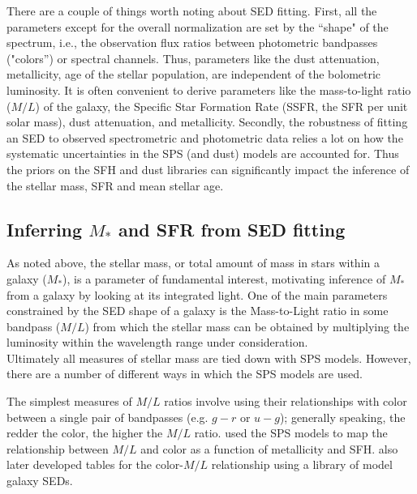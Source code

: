 There are a couple of things worth noting about SED fitting.  First,
all the parameters except for the overall normalization are set by the
``shape" of the spectrum, i.e., the observation flux ratios between
photometric bandpasses ("colors'') or spectral channels.  Thus,
parameters like the dust attenuation, metallicity, age of the stellar
population, are independent of the bolometric luminosity. It is often
convenient to derive parameters like the mass-to-light ratio ($M/L$)
of the galaxy, the Specific Star Formation Rate (SSFR, the SFR per
unit solar mass), dust attenuation, and metallicity.  Secondly, the
robustness of fitting an SED to observed spectrometric and photometric
data relies a lot on how the systematic uncertainties in the SPS (and
dust) models are accounted for. Thus the priors on the SFH and dust
libraries can significantly impact the inference of the stellar mass,
SFR and mean stellar age.\\


\subsection{Inferring $M_{*}$ and SFR from SED fitting}
\label{masses}

As noted above, the stellar mass, or total amount of mass in stars
within a galaxy ($M_\ast$), is a parameter of fundamental interest,
motivating inference of $M_{*}$ from a galaxy by looking at its
integrated light. One of the main parameters constrained by the SED
shape of a galaxy is the Mass-to-Light ratio in some bandpass ($M/L$)
from which the stellar mass can be obtained by multiplying the
luminosity within the wavelength range under consideration.\\
Ultimately all measures of stellar mass are tied down with SPS
models. However, there are a number of different ways in which the SPS
models are used.

The simplest measures of $M/L$ ratios involve using their
relationships with color between a single pair of bandpasses
(e.g. $g-r$ or $u-g$); generally speaking, the redder the color, the
higher the $M/L$ ratio. \citet{2001ApJ...550..212B} used the
\citet{bruzual_stellar_2003} SPS models to map the relationship
between $M/L$ and color as a function of metallicity and
SFH. \citep{2009MNRAS.400.1181Z} also later developed tables for the
color-$M/L$ relationship using a library of model galaxy SEDs.


